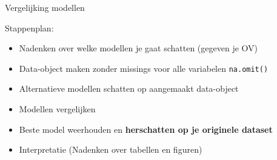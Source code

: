 \documentclass[
  10pt,
  ignorenonframetext,
]{beamer}
\providecommand{\tightlist}{%
  \setlength{\itemsep}{0pt}\setlength{\parskip}{0pt}}
\begin{document}
\begin{frame}[fragile]{Vergelijking modellen}
\protect\hypertarget{vergelijking-modellen-1}{}

Stappenplan:

\begin{itemize}
\tightlist
\item
  Nadenken over welke modellen je gaat schatten (gegeven je OV)
\item
  Data-object maken zonder missings voor alle variabelen
  \texttt{na.omit()}
\item
  Alternatieve modellen schatten op aangemaakt data-object
\item
  Modellen vergelijken
\item
  Beste model weerhouden en \textbf{herschatten op je originele dataset}
\item
  Interpretatie (Nadenken over tabellen en figuren)
\end{itemize}

\end{frame}
\end{document}
